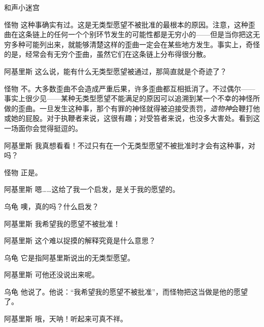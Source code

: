 \begin{dialog}{和声小迷宫}
\begin{dialogue}
\begin{dialogue}
\begin{dialogue}
    \item[怪物]这种事确实有过。这是无类型愿望不被批准的最根本的原因。注意，这种歪曲在这条链上的任何一个个别环节发生的可能性都是无穷小的——但是当你把这无穷多种可能列出来，就能够清楚这样的歪曲一定会在某些地方发生。事实上，奇怪的是，经常会有无穷个歪曲，虽然它们在这条链上分布得很分散。

    \item[阿基里斯]这么说，能有什么无类型愿望被通过，那简直就是个奇迹了？

    \item[怪物]不。大多数歪曲不会造成严重后果，许多歪曲都互相抵消了。不过偶尔——事实上很少见——某种无类型愿望不能满足的原因可以追溯到某一个不幸的神怪所做的歪曲。一旦发生这种事，那个有罪的神怪就得被迫接受责罚，\emph{造物神}会鞭打他或她的屁股。对于执鞭者来说，这很有趣；对受笞者来说，也没多大害处。看到这一场面你会觉得挺逗的。

    \item[阿基里斯]我真想看看！不过只有在一个无类型愿望不被批准时才会有这种事，对吗？

    \item[怪物]正是。

    \item[阿基里斯]嗯……这给了我一个启发，是关于我的愿望的。

    \item[乌龟]噢，真的吗？什么启发？

    \item[阿基里斯]我希望我的愿望不被批准！

  \end{dialogue}

  \item[阿基里斯]这个难以捉摸的解释究竟是什么意思？

  \item[乌龟]它是指阿基里斯说出的无类型愿望。

  \item[阿基里斯]可他还没说出来呢。

  \item[乌龟]他说了。他说：“我希望我的愿望不被批准”，而怪物把这当做是他的愿望了。


  \item[阿基里斯]哦，天呐！听起来可真不祥。



\end{dialogue}
\end{dialogue}
\end{dialog}
